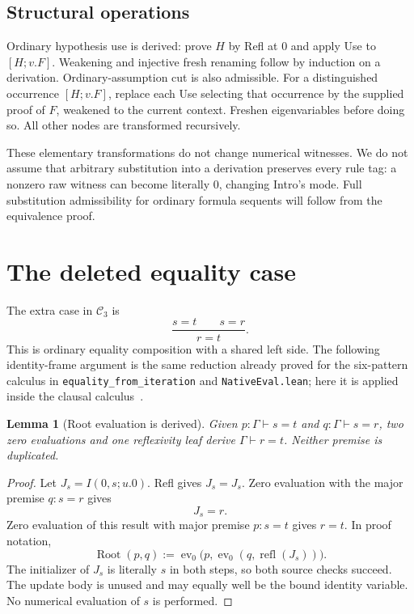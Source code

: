 \documentclass[11pt]{article}
\newtheorem{lemma}[theorem]{Lemma}
\theoremstyle{definition}\newtheorem{definition}[theorem]{Definition}
\newcommand{\Cthree}{\mathcal C_3}
\newcommand{\ev}{\operatorname{ev}}
\newcommand{\refl}{\operatorname{refl}}
\newcommand{\Root}{\operatorname{Root}}
\begin{document}
\subsection{Structural operations}

Ordinary hypothesis use is derived: prove $H$ by Refl at $0$ and
apply Use to $[H;v.F]$. Weakening and injective fresh renaming follow
by induction on a derivation. Ordinary-assumption cut is also
admissible. For a distinguished occurrence $[H;v.F]$, replace each
Use selecting that occurrence by the supplied proof of $F$, weakened
to the current context. Freshen eigenvariables before doing so.
All other nodes are transformed recursively.

These elementary transformations do not change numerical witnesses.
We do not assume that arbitrary substitution into a derivation
preserves every rule tag: a nonzero raw witness can become literally
$0$, changing Intro's mode. Full substitution admissibility for
ordinary formula sequents will follow from the equivalence proof.

\section{The deleted equality case}\label{sec:deletion}

The extra case in $\Cthree$ is
\[
            \frac{s=t\qquad s=r}{r=t}.
            \tag{Root}
\]
This is ordinary equality composition with a shared left side.
The following identity-frame argument is the same reduction already
proved for the six-pattern calculus in
\texttt{equality\_from\_iteration} and
\texttt{NativeEval.lean}; here it is applied inside the clausal
calculus~\cite{frame,lean}.

\begin{lemma}[Root evaluation is derived]\label{lem:root}
Given $p:\Gamma\vdash s=t$ and $q:\Gamma\vdash s=r$, two zero
evaluations and one reflexivity leaf derive $\Gamma\vdash r=t$.
Neither premise is duplicated.
\end{lemma}
\begin{proof}
Let $J_s=I(0,s;u.0)$. Refl gives $J_s=J_s$. Zero evaluation with
the major premise $q:s=r$ gives
\[
                  J_s=r.
\]
Zero evaluation of this result with major premise $p:s=t$ gives
$r=t$. In proof notation,
\[
 \Root(p,q):=\ev_0\bigl(p,\ev_0(q,\refl(J_s))\bigr).
\]
The initializer of $J_s$ is literally $s$ in both steps, so both
source checks succeed. The update body is unused and may equally
well be the bound identity variable. No numerical evaluation of
$s$ is performed.
\end{proof}
\end{document}
